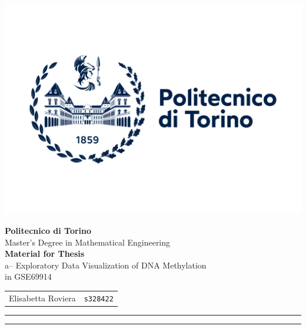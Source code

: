 \documentclass[10pt]{extarticle}
\begin{document}
\noindent
\begin{minipage}{0.3\textwidth}
    \includegraphics[width=1.3\linewidth]{Figures/polito_logo_2021_blu.jpg}
\end{minipage}
\hfill
\begin{minipage}{0.68\textwidth}
    \raggedleft
    {\LARGE \textbf{Politecnico di Torino}}\\[0.2cm]
    {\large Master's Degree in Mathematical Engineering}\\[0.7cm]
    {\large \textbf{Material for Thesis}}\\[0.2cm]
    {\large a-- Exploratory Data Visualization of DNA Methylation \\in GSE69914}\\[0.7cm]
    \begin{tabular}{rl}
        Elisabetta Roviera & \texttt{s328422} \\
    \end{tabular}
\end{minipage}

\vspace{1cm}
\hrule
\vspace{0.5cm}

\tableofcontents

\vspace{0.5cm}
\hrule
\vspace{1cm}


\justifying
\end{document}

